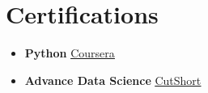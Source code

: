 \documentclass[letterpaper,11pt]{article}
\newcommand{\resumeSubHeadingListStart}{\begin{itemize}[leftmargin=*]}
\newcommand{\resumeSubHeadingListEnd}{\end{itemize}}
\begin{document}
\section{Certifications}
  \resumeSubHeadingListStart
    \item{
      \textbf{Python }\underline{\href{https://www.coursera.org/account/accomplishments/certificate/BGRL6KFPRFAL}{Coursera}}
      \hfill
    }
    \item{
      \textbf{Advance Data Science }\underline{\href{https://cutshort.io/certificate/7023}{CutShort}}
      \hfill
    }
  \resumeSubHeadingListEnd



\end{document}
